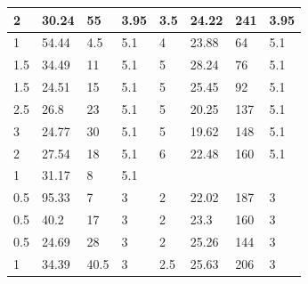 \documentclass[a4paper,12pt]{article} %
\begin{document}
\begin{table}[h!]
\begin{tabular}{|llll|llll|}
\multicolumn{1}{|l|}{2}   & \multicolumn{1}{l|}{30.24} & \multicolumn{1}{l|}{55}   & 3.95 & \multicolumn{1}{l|}{3.5} & \multicolumn{1}{l|}{24.22} & \multicolumn{1}{l|}{241} & 3.95 \\ \hline \hline
\multicolumn{1}{|l|}{1}   & \multicolumn{1}{l|}{54.44} & \multicolumn{1}{l|}{4.5}  & 5.1  & \multicolumn{1}{l|}{4}   & \multicolumn{1}{l|}{23.88} & \multicolumn{1}{l|}{64}  & 5.1  \\ \hline
\multicolumn{1}{|l|}{1.5} & \multicolumn{1}{l|}{34.49} & \multicolumn{1}{l|}{11}   & 5.1  & \multicolumn{1}{l|}{5}   & \multicolumn{1}{l|}{28.24} & \multicolumn{1}{l|}{76}  & 5.1  \\ \hline
\multicolumn{1}{|l|}{1.5} & \multicolumn{1}{l|}{24.51} & \multicolumn{1}{l|}{15}   & 5.1  & \multicolumn{1}{l|}{5}   & \multicolumn{1}{l|}{25.45} & \multicolumn{1}{l|}{92}  & 5.1  \\ \hline
\multicolumn{1}{|l|}{2.5} & \multicolumn{1}{l|}{26.8}  & \multicolumn{1}{l|}{23}   & 5.1  & \multicolumn{1}{l|}{5}   & \multicolumn{1}{l|}{20.25} & \multicolumn{1}{l|}{137} & 5.1  \\ \hline
\multicolumn{1}{|l|}{3}   & \multicolumn{1}{l|}{24.77} & \multicolumn{1}{l|}{30}   & 5.1  & \multicolumn{1}{l|}{5}   & \multicolumn{1}{l|}{19.62} & \multicolumn{1}{l|}{148} & 5.1  \\ \hline
\multicolumn{1}{|l|}{2}   & \multicolumn{1}{l|}{27.54} & \multicolumn{1}{l|}{18}   & 5.1  & \multicolumn{1}{l|}{6}   & \multicolumn{1}{l|}{22.48} & \multicolumn{1}{l|}{160} & 5.1  \\ \hline
\multicolumn{1}{|l|}{1}   & \multicolumn{1}{l|}{31.17} & \multicolumn{1}{l|}{8}    & 5.1  & \multicolumn{1}{l|}{}    & \multicolumn{1}{l|}{}      & \multicolumn{1}{l|}{}    &      \\ \hline \hline
\multicolumn{1}{|l|}{0.5} & \multicolumn{1}{l|}{95.33} & \multicolumn{1}{l|}{7}    & 3    & \multicolumn{1}{l|}{2}   & \multicolumn{1}{l|}{22.02} & \multicolumn{1}{l|}{187} & 3    \\ \hline
\multicolumn{1}{|l|}{0.5} & \multicolumn{1}{l|}{40.2}  & \multicolumn{1}{l|}{17}   & 3    & \multicolumn{1}{l|}{2}   & \multicolumn{1}{l|}{23.3}  & \multicolumn{1}{l|}{160} & 3    \\ \hline
\multicolumn{1}{|l|}{0.5} & \multicolumn{1}{l|}{24.69} & \multicolumn{1}{l|}{28}   & 3    & \multicolumn{1}{l|}{2}   & \multicolumn{1}{l|}{25.26} & \multicolumn{1}{l|}{144} & 3    \\ \hline
\multicolumn{1}{|l|}{1}   & \multicolumn{1}{l|}{34.39} & \multicolumn{1}{l|}{40.5} & 3    & \multicolumn{1}{l|}{2.5} & \multicolumn{1}{l|}{25.63} & \multicolumn{1}{l|}{206} & 3    \\ \hline

\end{tabular}
\end{table}
\end{document}

